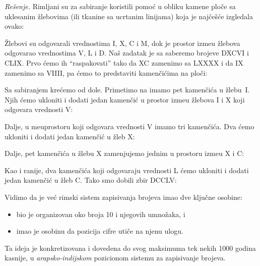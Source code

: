 \textit{Re\v senje.} Rimljani su za sabiranje koristili pomo\'c u obliku kamene plo\v ce sa uklesanim \v zlebovima (ili tkanine sa ucrtanim linijama)
koja je naj\v ce\v s\'ce izgledala ovako:
\begin{center}
    
\end{center}
\v Zlebovi su odgovarali vrednostima I, X, C i M, dok je prostor izme\dj u \v zlebova odgovarao vrednostima V, L i D.
Na\v s zadatak je sa saberemo brojeve DXCVI i CLIX. Prvo \'cemo ih \enquote{raspakovati} tako da XC zamenimo sa LXXXX i da IX zamenimo sa VIIII, pa \'cemo
to predstaviti kamen\v ci\'cima na plo\v ci:
\begin{center}
    
\end{center}
Sa sabiranjem kre\'cemo od dole. Primetimo na imamo pet kamen\v ci\'ca u \v zlebu~I. Njih \'cemo ukloniti i dodati jedan kamen\v ci\'c u prostor
izme\dj u \v zlebova I i X koji odgovara vrednosti V:
\begin{center}
    
\end{center}
Dalje, u me\dj uprostoru koji odgovara vrednosti V imamo tri kamen\v ci\'ca. Dva \'cemo ukloniti i dodati jedan kamen\v ci\'c u \v zleb X:
\begin{center}
    
\end{center}
Dalje, pet kamen\v ci\'ca u \v zlebu X zamenjujemo jednim u prostoru izme\dj u X i C:
\begin{center}
    
\end{center}
Kao i ranije, dva kamen\v ci\'ca koji odgovaraju vrednosti L \'cemo ukloniti i dodati jedan kamen\v ci\'c u \v zleb C.
Tako smo dobili zbir DCCLV:
\begin{center}
    
\end{center}

\bigskip

Vidimo da je ve\'c rimski sistem zapisivanja brojeva imao dve klju\v cne osobine:
\begin{itemize}
    \item bio je organizovan oko broja 10 i njegovih umno\v zaka, i
    \item imao je osobinu da pozicija cifre uti\v ce na njenu ulogu.
\end{itemize}
Ta ideja je konkretizovana i dovedena do svog maksimuma tek nekih 1000 godina kasnije, u \emph{arapsko-indijskom} pozicionom
sistemu za zapisivanje brojeva.
\fi

